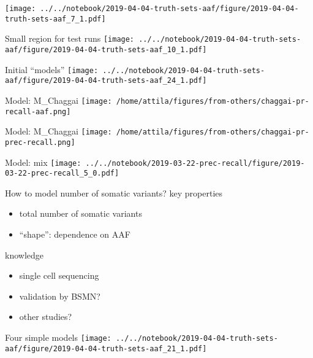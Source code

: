 \documentclass{beamer}
\begin{document}
\begin{frame}[plain]
\texttt{[image: ../../notebook/2019-04-04-truth-sets-aaf/figure/2019-04-04-truth-sets-aaf\_7\_1.pdf]}
\end{frame}

\begin{frame}{Small region for test runs}
\texttt{[image: ../../notebook/2019-04-04-truth-sets-aaf/figure/2019-04-04-truth-sets-aaf\_10\_1.pdf]}
\end{frame}

\begin{frame}[label=chaggais_model]{Initial ``models''}
\texttt{[image: ../../notebook/2019-04-04-truth-sets-aaf/figure/2019-04-04-truth-sets-aaf\_24\_1.pdf]}
\end{frame}

\begin{frame}{Model: M\_Chaggai}
\texttt{[image: /home/attila/figures/from-others/chaggai-pr-recall-aaf.png]}
\end{frame}

\begin{frame}{Model: M\_Chaggai}
\texttt{[image: /home/attila/figures/from-others/chaggai-pr-prec-recall.png]}
\end{frame}


\begin{frame}{Model: mix}
\texttt{[image: ../../notebook/2019-03-22-prec-recall/figure/2019-03-22-prec-recall\_5\_0.pdf]}
\end{frame}

\begin{frame}{How to model number of somatic variants?}
key properties
\begin{itemize}
\item total number of somatic variants
\item ``shape'': dependence on AAF 
\end{itemize}
\vfill
knowledge
\begin{itemize}
\item single cell sequencing
\item validation by BSMN? 
\item other studies? 
\end{itemize} 
\end{frame}

\begin{frame}[plain]
Four simple models
\texttt{[image: ../../notebook/2019-04-04-truth-sets-aaf/figure/2019-04-04-truth-sets-aaf\_21\_1.pdf]}
\end{frame}
\end{document}
